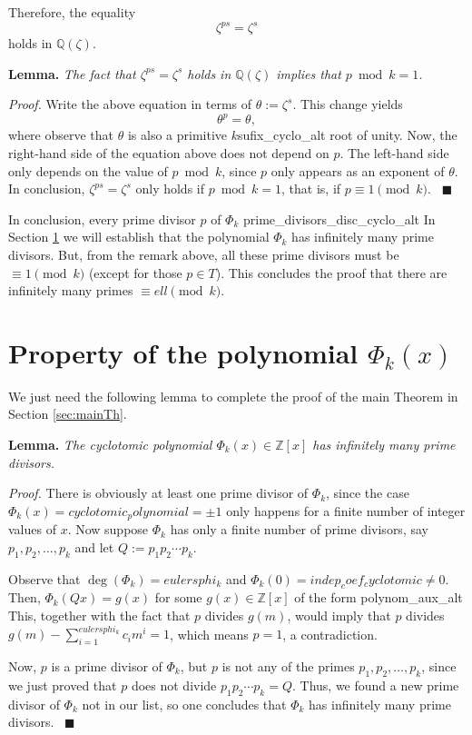 \documentclass[a4paper, 12pt]{article}
\theoremstyle{definition}
\newcommand{\Z}{\mathbb{Z}}
\newcommand{\Q}{\mathbb{Q}}
\DeclareMathOperator{\degpol}{deg} %
\begin{document}
Therefore, the equality
\begin{equation}\label{eq:equality_in_zeta}
\zeta^{ps}=\zeta^{s}
\end{equation}
holds in $\Q(\zeta)$. 

\textbf{Lemma.} \emph{The fact that $\zeta^{ps}=\zeta^{s}$ holds in $\Q(\zeta)$ implies that $p \bmod{{k}}=1$.}

\textit{Proof.} Write the above equation in terms of $\theta:=\zeta^{s}$. This change yields
\begin{equation*}
\theta^{p}=\theta,
\end{equation*}
where observe that $\theta$ is also a primitive ${k}${sufix_cyclo_alt} root of unity. Now, the right-hand side of the equation above does not depend on $p$. The left-hand side only depends on the value of $p\bmod{{k}}$, since $p$ only appears as an exponent of $\theta$. In conclusion, $\zeta^{ps}=\zeta^{s}$ only holds if $p \bmod{{k}}=1$, that is, if $p\equiv 1\pmod{{k}}$. \ $\blacksquare$

In conclusion, every prime divisor $p$ of $\Phi_{{k}}$ {prime_divisors_disc_cyclo_alt} In Section \ref{sec:properties} we will establish that the polynomial $\Phi_{{k}}$ has infinitely many prime divisors. But, from the remark above, all these prime divisors must be $\equiv 1\pmod{{k}}$ (except for those $p\in T$). This concludes the proof that there are infinitely many primes $\equiv {ell} \pmod{{k}}$.

\section{Property of the polynomial \texorpdfstring{$\Phi_{{k}}(x)$}{Pkx}}\label{sec:properties}

We just need the following lemma to complete the proof of the main Theorem in Section \ref{sec:mainTh}.

\textbf{Lemma.} \emph{The cyclotomic polynomial $\Phi_{{k}}(x)\in\Z[x]$ has infinitely many prime divisors.}

\textit{Proof.} There is obviously at least one prime divisor of $\Phi_{{k}}$, since the case $\Phi_{{k}}(x)={cyclotomic_polynomial}=\pm 1$ only happens for a finite number of integer values of $x$. Now suppose $\Phi_{{k}}$ has only a finite number of prime divisors, say $p_1, p_2,\dots,p_k$ and let $Q:=p_1p_2\cdots p_k$. 

Observe that $\degpol(\Phi_{{k}})={eulersphi_k}$ and $\Phi_{{k}}(0)={indep_coef_cyclotomic}\neq 0$. Then, $\Phi_{{k}}(Qx)=g(x)$ for some $g(x)\in\Z[x]$ of the form {polynom_aux_alt} This, together with the fact that $p$ divides $g(m)$, would imply that $p$ divides $g(m) - \sum_{i=1}^{{eulersphi_k}}c_im^i=1$, which means $p=1$, a contradiction. 

Now, $p$ is a prime divisor of $\Phi_{{k}}$, but $p$ is not any of the primes $p_1,p_2,\dots,p_k$, since we just proved that $p$ does not divide $p_1p_2\cdots p_k=Q$. Thus, we found a new prime divisor of $\Phi_{{k}}$ not in our list, so one concludes that $\Phi_{{k}}$ has infinitely many prime divisors. \ $\blacksquare$
\end{document}
